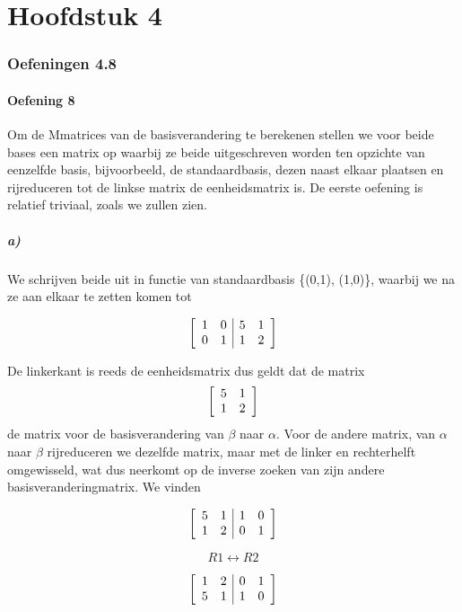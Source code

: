 \documentclass[lineaire_algebra_oplossingen.tex]{subfiles}
\begin{document}
\part{Hoofdstuk 4}
\section{Oefeningen 4.8}

\subsection{Oefening 8}
Om de Mmatrices van de basisverandering te berekenen stellen we voor beide bases een matrix op waarbij ze beide uitgeschreven worden ten opzichte van eenzelfde basis, bijvoorbeeld, de standaardbasis, dezen naast elkaar plaatsen en rijreduceren tot de linkse matrix de eenheidsmatrix is. De eerste oefening is relatief triviaal, zoals we zullen zien.
\subsubsection*{a)}
We schrijven beide uit in functie van standaardbasis \{(0,1), (1,0)\}, waarbij we na ze aan elkaar te zetten komen tot

\[
\left[
\begin{array}{ c c | c c }
1 & 0 & 5 & 1\\
0 & 1 & 1 & 2
\end{array}
\right]
\]

De linkerkant is reeds de eenheidsmatrix dus geldt dat de matrix 
\[
\left[
\begin{array}{ c c }
5 & 1\\
1 & 2
\end{array}
\right]
\]
de matrix voor de basisverandering van $\beta$ naar $\alpha$. Voor de andere matrix, van $\alpha$ naar $\beta$ rijreduceren we dezelfde matrix, maar met de linker en rechterhelft omgewisseld, wat dus neerkomt op de inverse zoeken van zijn andere basisveranderingmatrix. We vinden

\[
\left[
\begin{array}{ c c | c c }
5 & 1 & 1 & 0\\
1 & 2 & 0 & 1
\end{array}
\right]
\]

\[R1 \leftrightarrow R2 \]

\[
\left[
\begin{array}{ c c | c c }
1 & 2 & 0 & 1\\
5 & 1 & 1 & 0
\end{array}
\right]
\]
\end{document}

